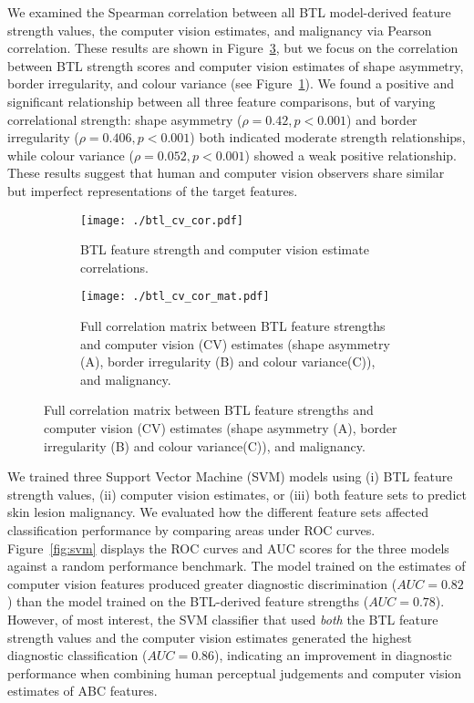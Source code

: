\documentclass[
    man, 12pt, a4paper,
    donotrepeattitle, floatsintext, draftfirst
]{apa7}
\begin{document}
We examined the Spearman correlation between all BTL model-derived feature strength values, the computer vision estimates, and malignancy via Pearson correlation.
These results are shown in Figure~\ref{fig:corr_mat}, but we focus on the correlation between BTL strength scores and computer vision estimates of shape asymmetry, border irregularity, and colour variance (see Figure~\ref{fig:corr}).
We found a positive and significant relationship between all three feature comparisons, but of varying correlational strength: shape asymmetry ($\rho = 0.42, p < 0.001$) and border irregularity ($\rho = 0.406, p < 0.001$) both indicated moderate strength relationships, while colour variance ($\rho = 0.052, p < 0.001$) showed a weak positive relationship.
These results suggest that human and computer vision observers share similar but imperfect representations of the target features.
\begin{figure}[tbh]
\begin{subfigure}{\textwidth}
    \caption{BTL feature strength and computer vision estimate correlations.}
    \label{fig:corr}
    \centering
    \texttt{[image: ./btl\_cv\_cor.pdf]}
\end{subfigure}
\begin{subfigure}{\textwidth}
    \caption{Full correlation matrix between BTL feature strengths and computer vision (CV) estimates (shape asymmetry (A), border irregularity (B) and colour variance(C)), and malignancy.}
    \label{fig:corr_mat}
    \centering
    \texttt{[image: ./btl\_cv\_cor\_mat.pdf]}
    \end{subfigure}
\end{figure}

We trained three Support Vector Machine (SVM) models using (i) BTL feature strength values, (ii) computer vision estimates, or (iii) both feature sets to predict skin lesion malignancy.
We evaluated how the different feature sets affected classification performance by comparing areas under ROC curves.
Figure~\ref{fig:svm} displays the ROC curves and AUC scores for the three models against a random performance benchmark.
The model trained on the estimates of computer vision features produced greater diagnostic discrimination ($AUC = 0.82$) than the model trained on the BTL-derived feature strengths ($AUC = 0.78$).
However, of most interest, the SVM classifier that used \textit{both} the BTL feature strength values and the computer vision estimates generated the highest diagnostic classification ($AUC = 0.86$), indicating an improvement in diagnostic performance when combining human perceptual judgements and computer vision estimates of ABC features.
\end{document}
